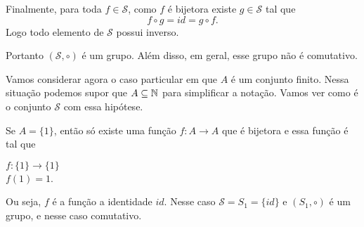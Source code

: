 \documentclass{beamer}
\begin{document}
    \begin{frame}

        Finalmente, para toda $f \in \mathcal{S}$, como $f$ \'e bijetora existe $g \in \mathcal{S}$ tal que
        \[
            f\circ g = id = g \circ f.
        \]
        Logo todo elemento de $\mathcal{S}$ possui inverso.

        \vspace{.3cm}

        Portanto $(\mathcal{S}, \circ)$ \'e um grupo. Al\'em disso, em geral, esse grupo n\~ao \'e comutativo.

        \vspace{.3cm}

        Vamos considerar agora o caso particular em que $A$ \'e um conjunto finito. Nessa situa\c{c}\~ao podemos supor que $A \subseteq \mathbb{N}$ para simplificar a nota\c{c}\~ao. Vamos ver como \'e o conjunto $\mathcal{S}$ com essa hip\'otese.

    \end{frame}

    \begin{frame}
        Se $A = \{1\}$, ent\~ao s\'o existe uma fun\c{c}\~ao $f : A \to A$ que \'e bijetora e essa fun\c{c}\~ao \'e tal que
        \begin{center}
            $f : \{1\} \to \{1\}$\\
            $f(1) = 1$.
        \end{center}
        Ou seja, $f$ \'e a fun\c{c}\~ao a identidade $id$. Nesse caso $\mathcal{S} = S_1 = \{id\}$ e $(S_1, \circ)$ \'e um grupo, e nesse caso comutativo.
    \end{frame}
    
\end{document}
